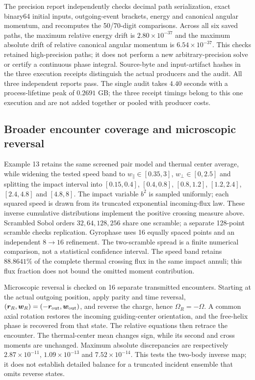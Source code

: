 \documentclass[11pt,letterpaper]{article}
\begin{document}
The precision report independently checks decimal path serialization,
exact binary64 initial inputs, outgoing-event brackets, energy and
canonical angular momentum, and recomputes the 50/70-digit comparisons.
Across all six saved paths, the maximum relative energy drift is
$2.80\times10^{-37}$ and the maximum absolute drift of relative
canonical angular momentum is $6.54\times10^{-37}$.
This checks retained high-precision paths;
it does not perform a new arbitrary-precision solve or certify a
continuous phase integral. Source-byte and input-artifact hashes in
the three execution receipts distinguish the actual producers and the
audit. All three independent reports pass. The single audit takes
$4.40$ seconds with a process-lifetime peak of $0.2691$ GB; the three
receipt timings belong to this one execution and are not added together
or pooled with producer costs.


\subsection*{Broader encounter coverage and microscopic reversal}
Example 13 retains the same screened pair model and thermal center average,
while widening the tested speed band to
$w_\parallel\in[0.35,3]$, $w_\perp\in[0,2.5]$ and splitting the impact
interval into $[0.15,0.4]$, $[0.4,0.8]$, $[0.8,1.2]$, $[1.2,2.4]$,
$[2.4,4.8]$ and $[4.8,8]$. The impact variable $b^2$ is sampled uniformly;
each squared speed is drawn from its truncated exponential incoming-flux
law. These inverse cumulative distributions implement the positive crossing
measure above. Scrambled Sobol orders $32,64,128,256$ share one scramble;
a separate 128-point scramble checks replication. Gyrophase uses 16 equally
spaced points and an independent $8\to16$ refinement. The two-scramble
spread is a finite numerical comparison, not a statistical confidence interval.
The speed band retains $88.8641\%$ of the complete thermal crossing flux in
the same impact annuli; this flux fraction does not bound the omitted
moment contribution.

Microscopic reversal is checked on 16 separate transmitted encounters.
Starting at the actual outgoing position, apply parity and time reversal,
$(\bm r_R,\bm w_R)=(-\bm r_{\rm out},\bm w_{\rm out})$, and reverse the
charge, hence $\Omega_R=-\Omega$. A common axial rotation restores the
incoming guiding-center orientation, and the free-helix phase is recovered
from that state. The relative equations then retrace the encounter. The
thermal-center mean changes sign, while its second and cross moments are
unchanged. Maximum absolute discrepancies are respectively
$2.87\times10^{-11}$, $1.09\times10^{-13}$ and $7.52\times10^{-14}$.
This tests the two-body inverse map; it does not establish detailed balance
for a truncated incident ensemble that omits reverse states.
\end{document}
